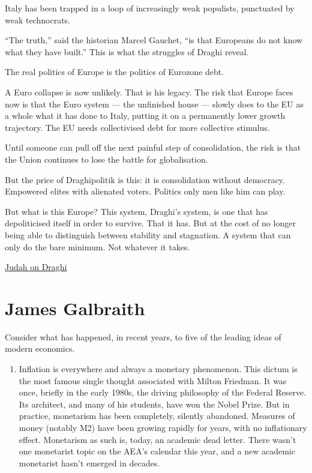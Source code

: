 \documentclass[
]{book}
\providecommand{\tightlist}{%
  \setlength{\itemsep}{0pt}\setlength{\parskip}{0pt}}
\begin{document}
Italy has been trapped in a loop of increasingly weak populists, punctuated by weak technocrats.

``The truth,'' said the historian Marcel Gauchet, ``is that Europeans do not know what they have built.'' This is what the struggles of Draghi reveal.

The real politics of Europe is the politics of Eurozone debt.

A Euro collapse is now unlikely. That is his legacy. The risk that Europe faces now is that the Euro system --- the unfinished house --- slowly does to the EU as a whole what it has done to Italy, putting it on a permanently lower growth trajectory. The EU needs collectivised debt for more collective stimulus.

Until someone can pull off the next painful step of consolidation, the risk is that the Union continues to lose the battle for globalisation.

But the price of Draghipolitik is this: it is consolidation without democracy. Empowered elites with alienated voters. Politics only men like him can play.

But what is this Europe? This system, Draghi's system, is one that has depoliticised itself in order to survive. That it has. But at the cost of no longer being able to distinguish between stability and stagnation. A system that can only do the bare minimum. Not whatever it takes.

\href{https://thecritic.co.uk/issues/may-2021/the-sphinx-who-reshaped-euro\%20pe/}{Judah on Draghi}

\hypertarget{james-galbraith}{%
\section{James Galbraith}\label{james-galbraith}}

Consider what has happened, in recent years, to five of the leading ideas of modern economics.

\begin{enumerate}
\def\labelenumi{\arabic{enumi}.}
\tightlist
\item
  Inflation is everywhere and always a monetary phenomenon. This dictum is the most famous single thought associated with Milton Friedman. It was once, briefly in the early 1980s, the driving philosophy of the Federal Reserve. Its architect, and many of his students, have won the Nobel Prize. But in practice, monetarism has been completely, silently abandoned. Measures of money (notably M2) have been growing rapidly for years, with no inflationary effect. Monetarism as such is, today, an academic dead letter. There wasn't one monetarist topic on the AEA's calendar this year, and a new academic monetarist hasn't emerged in decades.
\end{enumerate}
\end{document}
